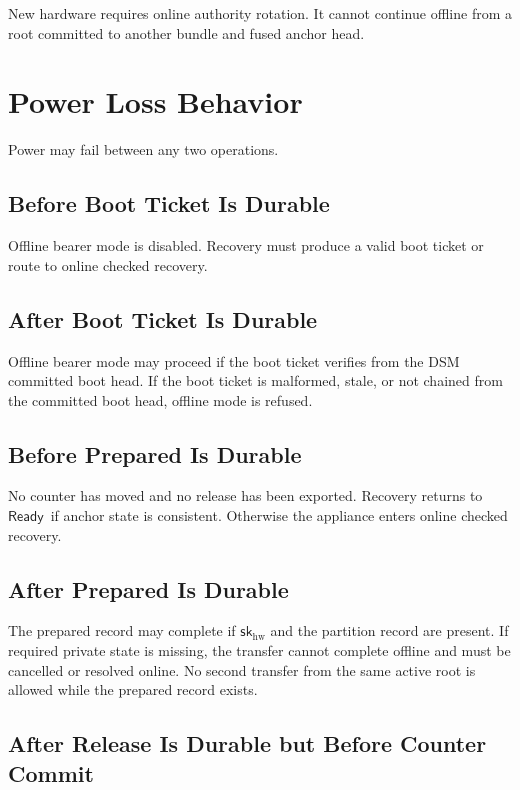 \documentclass[11pt]{article}
\theoremstyle{definition}
\theoremstyle{remark}
\newcommand{\Ready}{\ensuremath{\mathsf{Ready}}}
\newcommand{\skhw}{\ensuremath{\mathsf{sk}_{\mathrm{hw}}}}
\begin{document}
New hardware requires online authority rotation. It cannot continue offline from a root committed
to another bundle and fused anchor head.

\section{Power Loss Behavior}

Power may fail between any two operations.

\subsection{Before Boot Ticket Is Durable}

Offline bearer mode is disabled. Recovery must produce a valid boot ticket or route to online
checked recovery.

\subsection{After Boot Ticket Is Durable}

Offline bearer mode may proceed if the boot ticket verifies from the DSM committed boot head.
If the boot ticket is malformed, stale, or not chained from the committed boot head, offline mode
is refused.

\subsection{Before Prepared Is Durable}

No counter has moved and no release has been exported. Recovery returns to \Ready\ if anchor state
is consistent. Otherwise the appliance enters online checked recovery.

\subsection{After Prepared Is Durable}

The prepared record may complete if \(\skhw\) and the partition record are present. If required
private state is missing, the transfer cannot complete offline and must be cancelled or resolved
online. No second transfer from the same active root is allowed while the prepared record exists.

\subsection{After Release Is Durable but Before Counter Commit}
\end{document}
